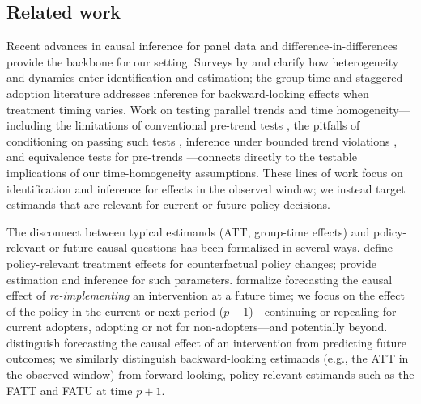 \documentclass{article}
\begin{document}
\subsection{Related work}

Recent advances in causal inference for panel data and difference-in-differences provide the backbone for our setting. Surveys by \citet{arkhangelskyCausalModelsLongitudinal2024} and \citet{dechaisemartinTwowayFixedEffects2023} clarify how heterogeneity and dynamics enter identification and estimation; the group-time and staggered-adoption literature \citep{callawayDifferenceindifferencesMultipleTime2021,sunEstimatingDynamicTreatment2021,rothEfficientEstimationStaggered2023,bakerDifferenceinDifferencesDesignsPractitioners2025} addresses inference for backward-looking effects when treatment timing varies. Work on testing parallel trends and time homogeneity---including the limitations of conventional pre-trend tests \citep{freyaldenhovenPreeventTrendsPanel2019}, the pitfalls of conditioning on passing such tests \citep{rothPretestCautionEventstudy2022}, inference under bounded trend violations \citep{rambachanMoreCredibleApproach2023}, and equivalence tests for pre-trends \citep{detteTestingEquivalencePreTrends2024}---connects directly to the testable implications of our time-homogeneity assumptions. These lines of work focus on identification and inference for effects in the observed window; we instead target estimands that are relevant for current or future policy decisions.

The disconnect between typical estimands (ATT, group-time effects) and policy-relevant or future causal questions has been formalized in several ways. \citet{heckmanPolicyRelevantTreatmentEffects2001} define policy-relevant treatment effects for counterfactual policy changes; \citet{sasakiEstimationInferencePolicy2023} provide estimation and inference for such parameters. \citet{forastiereForecastingCausalEffects2025} formalize forecasting the causal effect of \emph{re-implementing} an intervention at a future time; we focus on the effect of the policy in the current or next period ($p+1$)---continuing or repealing for current adopters, adopting or not for non-adopters---and potentially beyond. \citet{gischeForecastingCausalEffects2021} distinguish forecasting the causal effect of an intervention from predicting future outcomes; we similarly distinguish backward-looking estimands (e.g., the ATT in the observed window) from forward-looking, policy-relevant estimands such as the FATT and FATU at time $p+1$.
\end{document}
